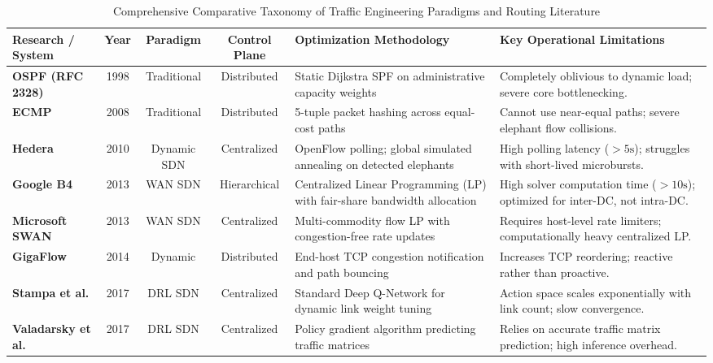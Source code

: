 \documentclass[12pt,a4paper,oneside]{report}
\begin{document}
\begin{table}[htbp]
\centering
\caption{Comprehensive Comparative Taxonomy of Traffic Engineering Paradigms and Routing Literature}
\label{tab:literature_taxonomy}
\scriptsize
\begin{tabularx}{\textwidth}{l c c c p{4.2cm} X}
\toprule
\textbf{Research / System} & \textbf{Year} & \textbf{Paradigm} & \textbf{Control Plane} & \textbf{Optimization Methodology} & \textbf{Key Operational Limitations} \\
\midrule
\textbf{OSPF (RFC 2328)} \cite{moy1998ospf} & 1998 & Traditional & Distributed & Static Dijkstra SPF on administrative capacity weights & Completely oblivious to dynamic load; severe core bottlenecking. \\
\addlinespace
\textbf{ECMP} \cite{al2008scalable} & 2008 & Traditional & Distributed & 5-tuple packet hashing across equal-cost paths & Cannot use near-equal paths; severe elephant flow collisions. \\
\addlinespace
\textbf{Hedera} \cite{al2010hedera} & 2010 & Dynamic SDN & Centralized & OpenFlow polling; global simulated annealing on detected elephants & High polling latency ($>5\text{s}$); struggles with short-lived microbursts. \\
\addlinespace
\textbf{Google B4} \cite{jain2013b4} & 2013 & WAN SDN & Hierarchical & Centralized Linear Programming (LP) with fair-share bandwidth allocation & High solver computation time ($>10\text{s}$); optimized for inter-DC, not intra-DC. \\
\addlinespace
\textbf{Microsoft SWAN} \cite{hong2013achieving} & 2013 & WAN SDN & Centralized & Multi-commodity flow LP with congestion-free rate updates & Requires host-level rate limiters; computationally heavy centralized LP. \\
\addlinespace
\textbf{GigaFlow} \cite{kabbani2014flowbender} & 2014 & Dynamic & Distributed & End-host TCP congestion notification and path bouncing & Increases TCP reordering; reactive rather than proactive. \\
\addlinespace
\textbf{Stampa et al.} \cite{stampa2017deep} & 2017 & DRL SDN & Centralized & Standard Deep Q-Network for dynamic link weight tuning & Action space scales exponentially with link count; slow convergence. \\
\addlinespace
\textbf{Valadarsky et al.} \cite{valadarsky2017learning} & 2017 & DRL SDN & Centralized & Policy gradient algorithm predicting traffic matrices & Relies on accurate traffic matrix prediction; high inference overhead. \\

\end{tabularx}
\end{table}
\end{document}
